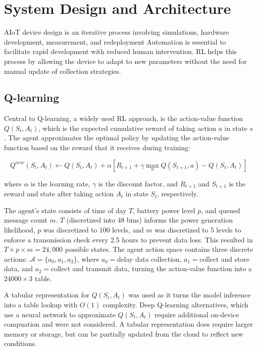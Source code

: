 \documentclass[10pt]{cai}
\begin{document}
\section{System Design and Architecture}

AIoT device design is an iterative process involving simulations, hardware development, measurement, and redeployment
Automation is essential to facilitate rapid development with reduced human intervention.
RL helps this process by allowing the device to adapt to new parameters without the need for manual update of collection strategies.

\subsection{Q-learning}

Central to Q-learning, a widely used RL approach, is the action-value function $Q(S_t, A_t)$, which is the expected cumulative reward of taking action $a$ in state $s$.
The agent approximates the optimal policy by updating the action-value function based on the reward that it receives during training\cite{suttonReinforcementLearningIntroduction2020}:

\begin{equation}
Q^{new}(S_t, A_t) \leftarrow Q(S_t, A_t) + \alpha \left[ R_{t+1} + \gamma \max_{a} Q(S_{t+1}, a) - Q(S_t, A_t) \right]
\end{equation}

where $\alpha$ is the learning rate, $\gamma$ is the discount factor, and $R_{t+1}$ and $S_{t+1}$ is the reward and state after taking action $A_t$ in state $S_{t}$, respectively.

The agent's state consists of time of day $T$, battery power level $p$, and queued message count $m$.
$T$ (discretized into 48 bins) informs the power generation likelihood, $p$ was discretized to 100 levels, and $m$ was discretized to 5 levels to enforce a transmission check every 2.5 hours to prevent data loss.
This resulted in $T\times p \times m = 24,000$ possible states. The agent action space contains three discrete actions: $\mathcal{A}=\{a_0, a_1, a_2\}$, where $a_0=$delay data collection, $a_1=$collect and store data, and $a_2=$collect and transmit data, turning the action-value function into a $24000 \times 3$ table.

A tabular representation for $Q(S_t, A_t)$ was used as it turns the model inference into a table lookup with $O(1)$ complexity.
Deep Q-learning alternatives, which use a neural network to approximate $Q(S_t, A_t)$ require additional on-device compuation and were not considered.
A tabular representation does require larger memory or storage, but can be partially updated from the cloud to reflect new conditions.
\end{document}

